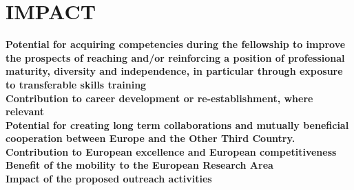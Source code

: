 \section{IMPACT} %
\label{sec:impact}
\textbf{Potential for acquiring competencies during the fellowship to improve the prospects of 
reaching and/or reinforcing a position of professional maturity, diversity and independence, 
in particular through exposure to transferable skills training} \\ 
\textbf{Contribution to career development or re-establishment, where relevant} \\
\textbf{Potential for creating long term collaborations and mutually beneficial cooperation between 
Europe and the Other Third Country.} \\
\textbf{Contribution to European excellence and European competitiveness} \\
\textbf{Benefit of the mobility to the European Research Area} \\
\textbf{Impact of the proposed outreach activities} \\
\newpage